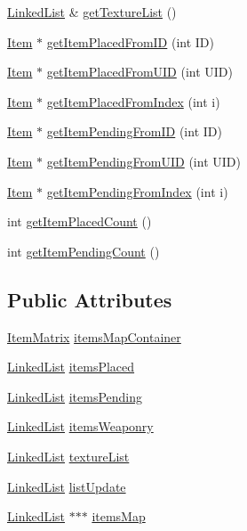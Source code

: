 \begin{DoxyCompactItemize}
\item 
\hyperlink{classLinkedList}{Linked\-List} \& \hyperlink{classShipItems_ae6e53eb02579b4e64ad640ba56fe3759}{get\-Texture\-List} ()
\item 
\hyperlink{classItem}{Item} $\ast$ \hyperlink{classShipItems_aaebf0d993affd21ec619233e0e654ae7}{get\-Item\-Placed\-From\-I\-D} (int I\-D)
\item 
\hyperlink{classItem}{Item} $\ast$ \hyperlink{classShipItems_a7204e19a3782177c271deddcd437af77}{get\-Item\-Placed\-From\-U\-I\-D} (int U\-I\-D)
\item 
\hyperlink{classItem}{Item} $\ast$ \hyperlink{classShipItems_a1e716d983b99a8e8c7ca730c9159e1ab}{get\-Item\-Placed\-From\-Index} (int i)
\item 
\hyperlink{classItem}{Item} $\ast$ \hyperlink{classShipItems_aa79604b85e2271567b30926eecedeb53}{get\-Item\-Pending\-From\-I\-D} (int I\-D)
\item 
\hyperlink{classItem}{Item} $\ast$ \hyperlink{classShipItems_aa30ae0f1bb8b3fc8201906fd031e78ec}{get\-Item\-Pending\-From\-U\-I\-D} (int U\-I\-D)
\item 
\hyperlink{classItem}{Item} $\ast$ \hyperlink{classShipItems_abb26bb09017b5f331f990833e959924b}{get\-Item\-Pending\-From\-Index} (int i)
\item 
int \hyperlink{classShipItems_ad48bad514797b873e253cf21a7d40288}{get\-Item\-Placed\-Count} ()
\item 
int \hyperlink{classShipItems_a9473269de6b8e8f7bdd41236ea294c1b}{get\-Item\-Pending\-Count} ()
\end{DoxyCompactItemize}
\subsection*{Public Attributes}
\begin{DoxyCompactItemize}
\item 
\hyperlink{classItemMatrix}{Item\-Matrix} \hyperlink{classShipItems_a465b928e53ec914789735aee07a7a719}{items\-Map\-Container}
\item 
\hyperlink{classLinkedList}{Linked\-List} \hyperlink{classShipItems_a3e71d1f18d3eee132394a9c524cb43e4}{items\-Placed}
\item 
\hyperlink{classLinkedList}{Linked\-List} \hyperlink{classShipItems_a4549ab087c77cf3bfade68ddec7ef8ee}{items\-Pending}
\item 
\hyperlink{classLinkedList}{Linked\-List} \hyperlink{classShipItems_afaec48b1818b5083c7d471ddce4430b3}{items\-Weaponry}
\item 
\hyperlink{classLinkedList}{Linked\-List} \hyperlink{classShipItems_adb0d04e59dc21442a04199a6d0043011}{texture\-List}
\item 
\hyperlink{classLinkedList}{Linked\-List} \hyperlink{classShipItems_ab9b7f9dcb3f50c2d724e150d5fa54cb4}{list\-Update}
\item 
\hyperlink{classLinkedList}{Linked\-List} $\ast$$\ast$$\ast$ \hyperlink{classShipItems_aaaa5d8305486800e29cdbf40861cda65}{items\-Map}
\end{DoxyCompactItemize}


